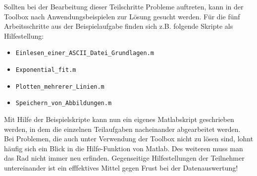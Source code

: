 \documentclass[a4paper,fleqn]{article}
\begin{document}
Sollten bei der Bearbeitung dieser Teilschritte Probleme auftreten, kann in der
Toolbox nach Anwendungsbeispielen zur Lösung gesucht werden. Für die fünf
Arbeitsschritte aus der Beispielaufgabe finden sich z.B. folgende Skripte als
Hilfestellung:

\begin{itemize}
  \item \verb+Einlesen_einer_ASCII_Datei_Grundlagen.m+
  \item \verb+Exponential_fit.m+
  \item \verb+Plotten_mehrerer_Linien.m+
  \item \verb+Speichern_von_Abbildungen.m+
\end{itemize}

Mit Hilfe der Beispielskripte kann nun ein eigenes Matlabskript geschrieben
werden, in dem die einzelnen Teilaufgaben nacheinander abgearbeitet
werden.\\

Bei Problemen, die auch unter Verwendung der Toolbox nicht zu lösen sind, lohnt
häufig sich ein Blick in die Hilfe-Funktion von Matlab. Des weiteren muss man
das Rad nicht immer neu erfinden. Gegenseitige Hilfestellungen der Teilnehmer
untereinander ist ein efffektives Mittel gegen Frust bei der Datenauswertung!
\end{document}
